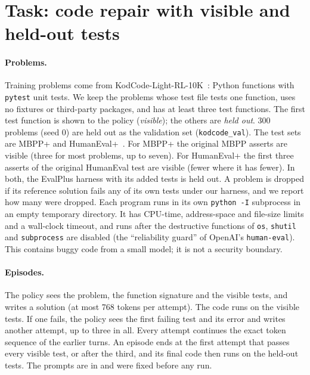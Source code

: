 
\section{Task: code repair with visible and held-out tests}\label{sec:task}

\paragraph{Problems.} Training problems come from KodCode-Light-RL-10K~\cite{xu2025kodcode}: Python functions with
\texttt{pytest} unit tests. We keep the problems whose test file tests one function, uses no fixtures or third-party
packages, and has at least three test functions. The first test function is shown to the policy (\emph{visible}); the
others are \emph{held out}. 300 problems (seed 0) are held out as the validation set (\texttt{kodcode\_val}). The test
sets are MBPP+ and HumanEval+~\cite{austin2021program,chen2021codex,liu2023evalplus}. For MBPP+ the original MBPP
asserts are visible (three for most problems, up to seven). For HumanEval+ the first three asserts of the original
HumanEval test are visible (fewer where it has fewer). In both, the
EvalPlus harness with its added tests is held out. A problem is dropped if its reference solution fails any of its own
tests under our harness, and we report how many were dropped. Each program runs in its own \texttt{python -I}
subprocess in an empty temporary directory. It has CPU-time, address-space and file-size limits and a wall-clock
timeout, and runs after the destructive functions of \texttt{os}, \texttt{shutil} and \texttt{subprocess} are disabled
(the ``reliability guard'' of OpenAI's \texttt{human-eval}). This contains buggy code from a small model; it is not a
security boundary.

\paragraph{Episodes.} The policy sees the problem, the function signature and the visible tests, and writes a
solution (at most 768 tokens per attempt). The code runs on the visible tests. If one fails, the policy sees the first
failing test and its error and writes another attempt, up to three in all. Every attempt continues the exact token
sequence of the earlier turns. An episode ends at the first attempt that passes every visible test, or after the third,
and its final code then runs on the held-out tests. The prompts are in
 and were fixed before any run.

